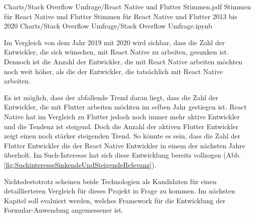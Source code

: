 \begin{alexfigurewithnotebook}{Charts/Stack Overflow Umfrage/React Native und Flutter Stimmen.pdf}
	{Stimmen für React Native und Flutter}
	{Stimmen für React Native und Flutter 2013 bis 2020}
	{Charts/Stack Overflow Umfrage/Stack Overflow Umfrage.ipynb}
	{}
	\label{fig:ReactNativeUndFlutterStimmen}

\end{alexfigurewithnotebook}

Im Vergleich von dem Jahr 2019 mit 2020 wird sichbar, dass die Zahl der Entwickler, die sich wünschen, mit React Native zu arbeiten, gesunken ist.
Dennoch ist die Anzahl der Entwickler, die mit React Native arbeiten möchten noch weit höher, als die der Entwickler, die tatsächlich mit React Native arbeiten.

Es ist möglich, dass der abfallende Trend daran liegt, dass die Zahl der Entwickler, die mit Flutter arbeiten möchten im selben Jahr gestiegen ist.
React Native hat im Vergleich zu Flutter jedoch noch immer mehr aktive Entwickler und die Tendenz ist steigend.
Doch die Anzahl der aktiven Flutter Entwickler zeigt einen noch stärker steigenden Trend.
So könnte es sein, dass die Zahl der Flutter Entwickler die der React Native Entwickler in einem der nächsten Jahre überholt.
Im Such-Interesse hat sich diese Entwicklung bereits vollzogen (Abb. \ref{fig:SuchinteresseSinkendeUndSteigendeRelevanz}). 

Nichtsdestotrotz scheinen beide Technologien als Kandidaten für einen detaillierteren Vergleich für dieses Projekt in Frage zu kommen.
Im nächsten Kapitel soll evaluiert werden, welches Framework für die Entwicklung der Formular-Anwendung angemessener ist.



